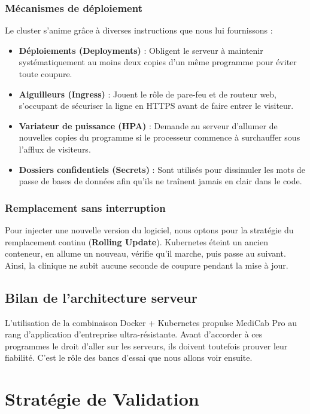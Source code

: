 \documentclass[final]{report}
\begin{document}
\subsection{Mécanismes de déploiement}
Le cluster s'anime grâce à diverses instructions que nous lui fournissons :
\begin{itemize}
  \item \textbf{Déploiements (Deployments)} : Obligent le serveur à maintenir systématiquement au moins deux copies d'un même programme pour éviter toute coupure.
  \item \textbf{Aiguilleurs (Ingress)} : Jouent le rôle de pare-feu et de routeur web, s'occupant de sécuriser la ligne en HTTPS avant de faire entrer le visiteur.
  \item \textbf{Variateur de puissance (HPA)} : Demande au serveur d'allumer de nouvelles copies du programme si le processeur commence à surchauffer sous l'afflux de visiteurs.
  \item \textbf{Dossiers confidentiels (Secrets)} : Sont utilisés pour dissimuler les mots de passe de bases de données afin qu'ils ne traînent jamais en clair dans le code.
\end{itemize}
 
\subsection{Remplacement sans interruption}
Pour injecter une nouvelle version du logiciel, nous optons pour la stratégie du remplacement continu (\textbf{Rolling Update}). Kubernetes éteint un ancien conteneur, en allume un nouveau, vérifie qu'il marche, puis passe au suivant. Ainsi, la clinique ne subit aucune seconde de coupure pendant la mise à jour.
 
\section{Bilan de l'architecture serveur}
L'utilisation de la combinaison Docker + Kubernetes propulse MediCab Pro au rang d'application d'entreprise ultra-résistante. Avant d'accorder à ces programmes le droit d'aller sur les serveurs, ils doivent toutefois prouver leur fiabilité. C'est le rôle des bancs d'essai que nous allons voir ensuite.
 

\chapter{Stratégie de Validation}
 
\end{document}

